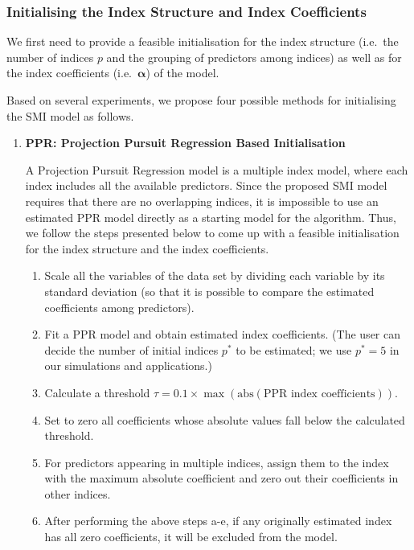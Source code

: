 \documentclass[
  11pt,
  a4paper,
]{article}
\providecommand{\tightlist}{%
  \setlength{\itemsep}{0pt}\setlength{\parskip}{0pt}}\usepackage{longtable,booktabs,array}
\begin{document}
\subsubsection{Initialising the Index Structure and Index
Coefficients}\label{sec-step1}

We first need to provide a feasible initialisation for the index
structure (i.e.~the number of indices \(p\) and the grouping of
predictors among indices) as well as for the index coefficients
(i.e.~\(\bm{\alpha}\)) of the model.

Based on several experiments, we propose four possible methods for
initialising the SMI model as follows.

\begin{enumerate}
\def\labelenumi{\arabic{enumi}.}
\item
  \textbf{PPR: Projection Pursuit Regression Based Initialisation}

  A Projection Pursuit Regression model \autocite{Friedman1981} is a
  multiple index model, where each index includes all the available
  predictors. Since the proposed SMI model requires that there are no
  overlapping indices, it is impossible to use an estimated PPR model
  directly as a starting model for the algorithm. Thus, we follow the
  steps presented below to come up with a feasible initialisation for
  the index structure and the index coefficients.

  \begin{enumerate}
  \def\labelenumii{\alph{enumii}.}
  \tightlist
  \item
    Scale all the variables of the data set by dividing each variable by
    its standard deviation (so that it is possible to compare the
    estimated coefficients among predictors).
  \item
    Fit a PPR model and obtain estimated index coefficients. (The user
    can decide the number of initial indices \(p^*\) to be estimated; we
    use \(p^* = 5\) in our simulations and applications.)
  \item
    Calculate a threshold
    \(\tau = 0.1 \times \max(\mathrm{abs}(\text{PPR index coefficients}))\).
  \item
    Set to zero all coefficients whose absolute values fall below the
    calculated threshold.
  \item
    For predictors appearing in multiple indices, assign them to the
    index with the maximum absolute coefficient and zero out their
    coefficients in other indices.
  \item
    After performing the above steps a-e, if any originally estimated
    index has all zero coefficients, it will be excluded from the model.
  \end{enumerate}


\end{enumerate}
\end{document}
